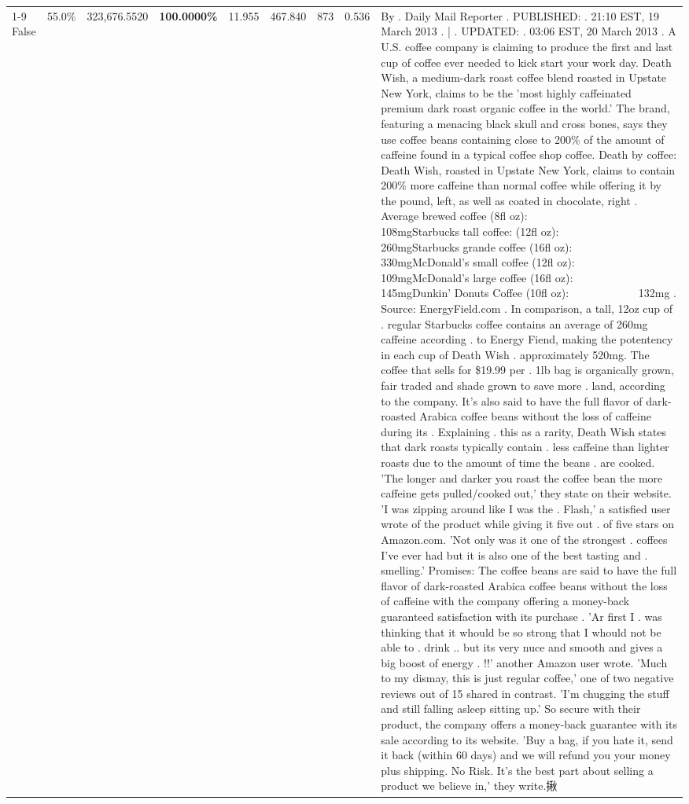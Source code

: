 \begin{table}[H]
{\begin{tabular}{lllrlllll}
\cline{1-9}
False & 55.0\% & 323,676.5520 & \bfseries \color{red} 100.0000\% & 11.955 & 467.840 & 873 & 0.536 & By . Daily Mail Reporter . PUBLISHED: . 21:10 EST, 19 March 2013 . | . UPDATED: . 03:06 EST, 20 March 2013 . A U.S. coffee company is claiming to produce the first and last cup of coffee ever needed to kick start your work day. Death Wish, a medium-dark roast coffee blend roasted in Upstate New York, claims to be the 'most highly caffeinated premium dark roast organic coffee in the world.' The brand, featuring a menacing black skull and cross bones, says they use coffee beans containing close to 200\% of the amount of caffeine found in a typical coffee shop coffee. Death by coffee: Death Wish, roasted in Upstate New York, claims to contain 200\% more caffeine than normal coffee while offering it by the pound, left, as well as coated in chocolate, right . Average brewed coffee (8fl oz):              108mgStarbucks tall coffee: (12fl oz):                260mgStarbucks grande coffee (16fl oz):         330mgMcDonald's small coffee (12fl oz):           109mgMcDonald's large coffee (16fl oz):           145mgDunkin' Donuts Coffee (10fl oz):             132mg . Source: EnergyField.com . In comparison, a tall, 12oz cup of . regular Starbucks coffee contains an average of 260mg caffeine according . to Energy Fiend, making the potentency in each cup of Death Wish . approximately 520mg. The coffee that sells for \$19.99 per . 1lb bag is organically grown, fair traded and shade grown to save more . land, according to the company. It's also said to have the full flavor of dark-roasted Arabica coffee beans without the loss of caffeine during its . Explaining . this as a rarity, Death Wish states that dark roasts typically contain . less caffeine than lighter roasts due to the amount of time the beans . are cooked. 'The longer and darker you roast the coffee bean the more caffeine gets pulled/cooked out,' they state on their website. 'I was zipping around like I was the . Flash,' a satisfied user wrote of the product while giving it five out . of five stars on Amazon.com. 'Not only was it one of the strongest . coffees I've ever had but it is also one of the best tasting and . smelling.’ Promises: The coffee beans are said to have the full flavor of dark-roasted Arabica coffee beans without the loss of caffeine with the company offering a money-back guaranteed satisfaction with its purchase . 'Ar first I . was thinking that it whould be so strong that I whould not be able to . drink .. but its very nuce and smooth and gives a big boost of energy . !!' another Amazon user wrote. 'Much to my dismay, this is just regular coffee,' one of two negative reviews out of 15 shared in contrast. 'I'm chugging the stuff and still falling asleep sitting up.' So secure with their product, the company offers a money-back guarantee with its sale according to its website. 'Buy a bag, if you hate it, send it back (within 60 days) and we will refund you your money plus shipping. No Risk. It’s the best part about selling a product we believe in,' they write.揪 \\

\end{tabular}}
\end{table}
